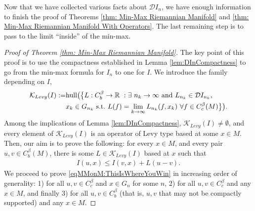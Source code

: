 \documentclass[11pt,reqno]{amsart}
\numberwithin{equation}{section}
\theoremstyle{plain}
\def\D{\mathcal D}
\def\K{\mathcal K}
\def\hull{\textnormal{hull}}
\begin{document}
Now that we have collected various facts about $\D I_n$, we have enough information to finish the proof of Theorems \ref{thm: Min-Max Riemannian Manifold} and \ref{thm: Min-Max Riemannian Manifold With Operators}.  The last remaining step is to pass to the limit ``inside'' of the min-max. 


\begin{proof}[Proof of Theorem \ref{thm: Min-Max Riemannian Manifold}]

The key point of this proof is to use the compactness established in Lemma \ref{lem:DInCompactness} to go from the min-max formula for $I_n$ to one for $I$. We introduce the family depending on $I$, 
\begin{align}
  \K_{Levy}(I) := &\hull\big( \big\{L:C^\beta_b \to \mathbb{R}\ : \exists \ n_k \to \infty \textnormal{ and } L_{n_k}\in \D I_{n_k}, \notag \\ 
		&   x_{k} \in G_{n_k} \text{ s.t.}\ L(f) = \lim_{k\to\infty} L_{n_k}(f,x_k)\ \forall f\in C^\beta_c(M)\label{eqMMonM:Def KLevy} \big\}   \big).
\end{align}
Among the implications of Lemma \ref{lem:DInCompactness}, $\K_{Levy}(I) \neq \emptyset$, and every element of $\K_{Levy}(I)$ is an operator of Levy type based at some $x\in M$. Then, our aim is to prove the following: for every $x\in M$, and every pair $u,v\in C^\beta_b(M)$, there is some $L \in \K_{Levy}(I)$ based at $x$ such that
\begin{align}\label{eqMMonM:ThisIsWhereYouWin}
    I(u,x) \leq I(v,x) + L(u-v).
\end{align}	
We proceed to prove \eqref{eqMMonM:ThisIsWhereYouWin} in increasing order of generality: 1) for all $u,v \in C^\beta_c$ and $x\in G_n$ for some $n$, 2) for all $u,v \in C^\beta_c$ and any $x \in M$, and finally 3) for all $u,v \in C^\beta_b$ (that is, $u,v$ that may not be compactly supported) and any $x\in M$.


\end{proof}
\end{document}
